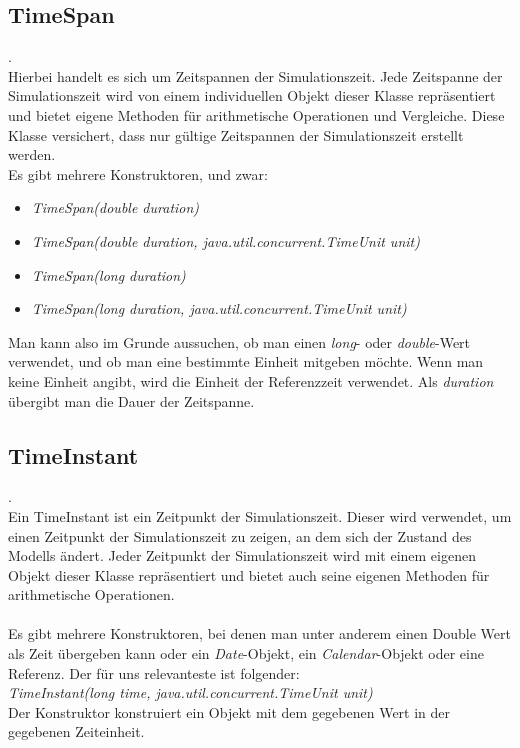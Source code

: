 \documentclass[runningheads]{llncs}
\begin{document}
\subsection{TimeSpan}
.\\
Hierbei handelt es sich um Zeitspannen der Simulationszeit. Jede Zeitspanne der Simulationszeit wird von einem individuellen Objekt dieser Klasse repräsentiert und bietet eigene Methoden für arithmetische Operationen und Vergleiche. Diese Klasse versichert, dass nur gültige Zeitspannen der Simulationszeit erstellt werden.\\
Es gibt mehrere Konstruktoren, und zwar:
\begin{itemize}
\item \textit{TimeSpan(double duration)}
\item \textit{TimeSpan(double duration, java.util.concurrent.TimeUnit unit)}
\item \textit{TimeSpan(long duration)}
\item \textit{TimeSpan(long duration, java.util.concurrent.TimeUnit unit)}
\end{itemize}
Man kann also im Grunde aussuchen, ob man einen \textit{long}- oder \textit{double}-Wert verwendet, und ob man eine bestimmte Einheit mitgeben möchte. Wenn man keine Einheit angibt, wird die Einheit der Referenzzeit verwendet. Als \textit{duration} übergibt man die Dauer der Zeitspanne.\\

\subsection{TimeInstant}
.\\
Ein TimeInstant ist ein Zeitpunkt der Simulationszeit. Dieser wird verwendet, um einen Zeitpunkt der Simulationszeit zu zeigen, an dem sich der Zustand des Modells ändert. Jeder Zeitpunkt der Simulationszeit wird mit einem eigenen Objekt dieser Klasse repräsentiert und bietet auch seine eigenen Methoden für arithmetische Operationen.\\
 \\
Es gibt mehrere Konstruktoren, bei denen man unter anderem einen Double Wert als Zeit übergeben kann oder ein \textit{Date}-Objekt, ein \textit{Calendar}-Objekt oder eine Referenz. Der für uns relevanteste ist folgender:\\
\textit{TimeInstant(long time, java.util.concurrent.TimeUnit unit)}\\
Der Konstruktor konstruiert ein Objekt mit dem gegebenen Wert in der gegebenen Zeiteinheit. \\
\end{document}
